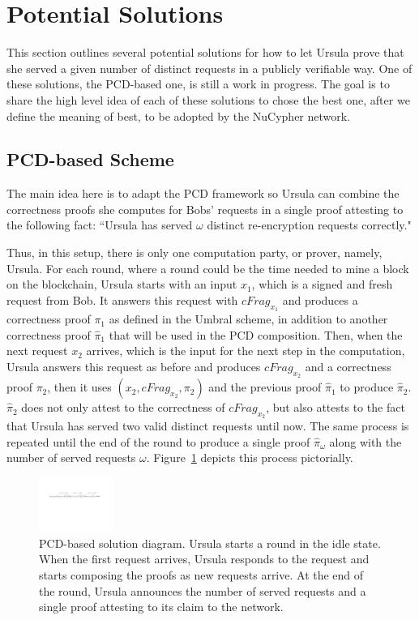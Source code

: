 \section{Potential Solutions}
\label{solutions}
This section outlines several potential solutions for how to let Ursula prove 
that she served a given number of distinct requests in a publicly verifiable way. 
One of these solutions, the PCD-based one, is still a work in progress. The goal 
is to share the high level idea of each of these solutions to chose the best one, 
after we define the meaning of best, to be adopted by the NuCypher network.


\subsection{PCD-based Scheme}
The main idea here is to adapt the PCD framework so Ursula 
can combine the correctness proofs she computes for Bobs' requests in a single proof 
attesting to the following fact: ``Ursula has served $\omega$ distinct re-encryption 
requests correctly." 


Thus, in this setup, there is only one computation party, or prover, namely, Ursula. 
For each round, where a round could be the time needed to mine a block on the 
blockchain, Ursula starts with an input $x_1$, which is a signed and fresh request 
from Bob. It answers this request with $cFrag_{x_1}$ and produces a correctness 
proof $\pi_1$ as defined in the Umbral scheme, in addition to another correctness 
proof $\hat{\pi}_1$ that will be used in the PCD composition. Then, when the next request $x_2$ arrives, 
which is the input for the next step in the computation, Ursula answers 
this request as before and produces $cFrag_{x_2}$ and a correctness proof $\pi_2$, then 
it uses $(x_2, cFrag_{x_2}, \pi_2)$ and the previous proof $\hat{\pi}_1$ to produce $\hat{\pi}_2$. 
$\hat{\pi}_2$ does not only 
attest to the correctness of $cFrag_{x_2}$, but also attests to the fact that Ursula has served 
two valid distinct requests until now. The same process is repeated until the end of the 
round to produce a single proof $\hat{\pi}_{\omega}$ along with the number of 
served requests $\omega$. Figure~\ref{pcd-based-sol} depicts 
this process pictorially.


\begin{figure}[h!]
\centerline{
\includegraphics[height= 0.7in, width = 1.0\columnwidth]{figures/pcd-based-sol.pdf}}
\caption{PCD-based solution diagram. Ursula starts a round in the idle state. When 
the first request arrives, Ursula responds to the request and starts composing the 
proofs as new requests arrive. At the end of the round, Ursula announces the number of 
served requests and a single proof attesting to its claim to the network. }
\label{pcd-based-sol}
\end{figure}


